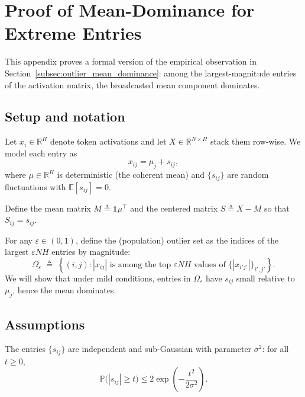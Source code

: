 \appendix
\section{Proof of Mean-Dominance for Extreme Entries}
\label{app:outlier_bias_proof}

This appendix proves a formal version of the empirical observation in
Section~\ref{subsec:outlier_mean_dominance}:
among the largest-magnitude entries of the activation matrix, the broadcasted
mean component dominates.

\subsection{Setup and notation}

Let $x_i \in \mathbb{R}^H$ denote token activations and let $X\in\mathbb{R}^{N\times H}$
stack them row-wise. We model each entry as
\begin{equation}
\label{eq:app_model_entry}
x_{ij} = \mu_j + s_{ij},
\end{equation}
where $\mu\in\mathbb{R}^H$ is deterministic (the coherent mean) and
$\{s_{ij}\}$ are random fluctuations with $\mathbb{E}[s_{ij}]=0$.

Define the mean matrix $M\triangleq \mathbf{1}\mu^\top$ and the centered matrix
$S\triangleq X-M$ so that $S_{ij}=s_{ij}$.

For any $\varepsilon\in(0,1)$, define the (population) outlier set as the indices
of the largest $\varepsilon NH$ entries by magnitude:
\begin{equation}
\label{eq:app_outlier_set}
\Omega_\varepsilon
\;\triangleq\;
\left\{(i,j): |x_{ij}| \text{ is among the top } \varepsilon NH \text{ values of } \{|x_{i'j'}|\}_{i',j'} \right\}.
\end{equation}
We will show that under mild conditions, entries in $\Omega_\varepsilon$ have
$s_{ij}$ small relative to $\mu_j$, hence the mean dominates.

\subsection{Assumptions}

\begin{assumption}
\label{assump:subg}
The entries $\{s_{ij}\}$ are independent and sub-Gaussian with parameter $\sigma^2$:
for all $t\ge 0$,
\[
\mathbb{P}\big(|s_{ij}| \ge t\big) \le 2\exp\!\left(-\frac{t^2}{2\sigma^2}\right).
\]
\end{assumption}

